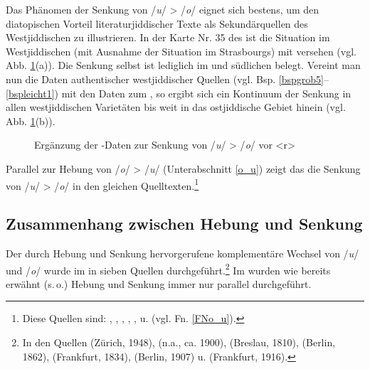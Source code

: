 Das Phänomen der Senkung von /\textit{u}/ > /\textit{o}/ eignet sich bestens, um den diatopischen Vorteil literaturjiddischer Texte als Sekundärquellen des Westjiddischen zu illustrieren. In der Karte Nr. 35 des  ist die Situation im Westjiddischen (mit Ausnahme der Situation im  Strasbourgs) mit  versehen (vgl. Abb. \ref{ProtoLCAAJOEWY2}(a)). Die Senkung selbst ist lediglich im  und südlichen  belegt. Vereint man nun die Daten authentischer westjiddischer Quellen (vgl. Bsp. \ref{bspgrob5}–\ref{bspleicht1}) mit den Daten zum , so ergibt sich ein  Kontinuum der Senkung in allen westjiddischen Varietäten bis weit in das ostjiddische Gebiet hinein (vgl. Abb. \ref{ProtoLCAAJOEWY2}(b)).\\
 
 \begin{figure}


\caption{Ergänzung der -Daten zur Senkung von /\textit{u}/ > /\textit{o}/ vor <r>}
\label{ProtoLCAAJOEWY2}
\end{figure}
\FloatBarrier

 
 
 Parallel zur Hebung von /\textit{o}/ > /\textit{u}/ (Unterabschnitt \ref{o_u}) zeigt das  die Senkung von /\textit{u}/ > /\textit{o}/ in den gleichen Quelltexten.\footnote{Diese Quellen sind: , , , , ,  u.  (vgl. Fn. \ref{FNo_u}).} 
 
 
  \subsection{Zusammenhang zwischen Hebung und Senkung} \label{ou_uo}

Der durch Hebung und Senkung hervorgerufene komplementäre Wechsel von /\textit{u}/ und /\textit{o}/ wurde im  in sieben Quellen durchgeführt.\footnote{In den Quellen  (Zürich, 1948),  (n.a., ca. 1900),  (Breslau, 1810),  (Berlin, 1862),  (Frankfurt, 1834),  (Berlin, 1907) u.  (Frankfurt, 1916).} Im  wurden wie bereits erwähnt (s.\,o.) Hebung und Senkung immer nur parallel durchgeführt. 

